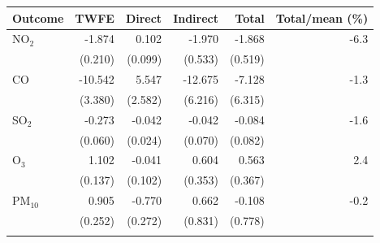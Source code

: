 \begin{tabular}{lrrrrr}
\toprule
Outcome & TWFE & Direct & Indirect & Total & Total/mean (\%) \\
\midrule
NO$_2$ & -1.874 & 0.102 & -1.970 & -1.868 & -6.3 \\
 & (0.210) & (0.099) & (0.533) & (0.519) &  \\
\addlinespace[3pt]
CO & -10.542 & 5.547 & -12.675 & -7.128 & -1.3 \\
 & (3.380) & (2.582) & (6.216) & (6.315) &  \\
\addlinespace[3pt]
SO$_2$ & -0.273 & -0.042 & -0.042 & -0.084 & -1.6 \\
 & (0.060) & (0.024) & (0.070) & (0.082) &  \\
\addlinespace[3pt]
O$_3$ & 1.102 & -0.041 & 0.604 & 0.563 & 2.4 \\
 & (0.137) & (0.102) & (0.353) & (0.367) &  \\
\addlinespace[3pt]
PM$_{10}$ & 0.905 & -0.770 & 0.662 & -0.108 & -0.2 \\
 & (0.252) & (0.272) & (0.831) & (0.778) &  \\
\addlinespace[3pt]
\bottomrule
\end{tabular}
